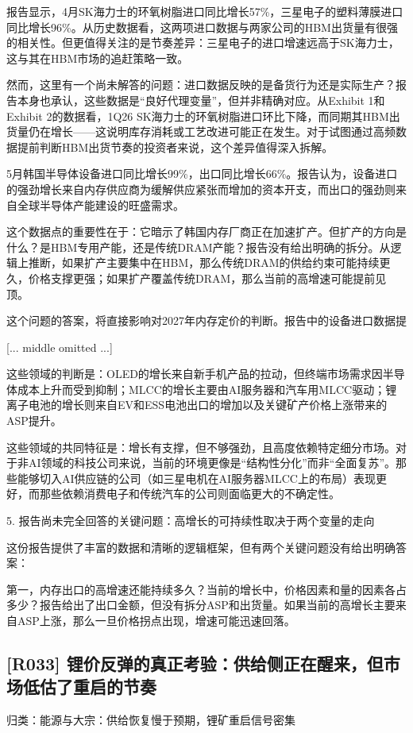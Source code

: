 \documentclass[11pt]{ctexart}
\begin{document}
报告显示，4月SK海力士的环氧树脂进口同比增长57\%，三星电子的塑料薄膜进口同比增长96\%。从历史数据看，这两项进口数据与两家公司的HBM出货量有很强的相关性。但更值得关注的是节奏差异：三星电子的进口增速远高于SK海力士，这与其在HBM市场的追赶策略一致。

然而，这里有一个尚未解答的问题：进口数据反映的是备货行为还是实际生产？报告本身也承认，这些数据是“良好代理变量”，但并非精确对应。从Exhibit 1和Exhibit 2的数据看，1Q26 SK海力士的环氧树脂进口环比下降，而同期其HBM出货量仍在增长——这说明库存消耗或工艺改进可能正在发生。对于试图通过高频数据提前判断HBM出货节奏的投资者来说，这个差异值得深入拆解。

5月韩国半导体设备进口同比增长99\%，出口同比增长66\%。报告认为，设备进口的强劲增长来自内存供应商为缓解供应紧张而增加的资本开支，而出口的强劲则来自全球半导体产能建设的旺盛需求。

这个数据点的重要性在于：它暗示了韩国内存厂商正在加速扩产。但扩产的方向是什么？是HBM专用产能，还是传统DRAM产能？报告没有给出明确的拆分。从逻辑上推断，如果扩产主要集中在HBM，那么传统DRAM的供给约束可能持续更久，价格支撑更强；如果扩产覆盖传统DRAM，那么当前的高增速可能提前见顶。

这个问题的答案，将直接影响对2027年内存定价的判断。报告中的设备进口数据提

[... middle omitted ...]

这些领域的判断是：OLED的增长来自新手机产品的拉动，但终端市场需求因半导体成本上升而受到抑制；MLCC的增长主要由AI服务器和汽车用MLCC驱动；锂离子电池的增长则来自EV和ESS电池出口的增加以及关键矿产价格上涨带来的ASP提升。

这些领域的共同特征是：增长有支撑，但不够强劲，且高度依赖特定细分市场。对于非AI领域的科技公司来说，当前的环境更像是“结构性分化”而非“全面复苏”。那些能够切入AI供应链的公司（如三星电机在AI服务器MLCC上的布局）表现更好，而那些依赖消费电子和传统汽车的公司则面临更大的不确定性。

5. 报告尚未完全回答的关键问题：高增长的可持续性取决于两个变量的走向

这份报告提供了丰富的数据和清晰的逻辑框架，但有两个关键问题没有给出明确答案：

第一，内存出口的高增速还能持续多久？当前的增长中，价格因素和量的因素各占多少？报告给出了出口金额，但没有拆分ASP和出货量。如果当前的高增长主要来自ASP上涨，那么一旦价格拐点出现，增速可能迅速回落。

\subsection{[R033] 锂价反弹的真正考验：供给侧正在醒来，但市场低估了重启的节奏}
{\small\color{refgray}归类：能源与大宗：供给恢复慢于预期，锂矿重启信号密集}
\end{document}
